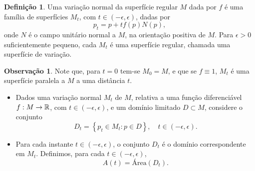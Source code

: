 \documentclass[10pt,a4paper]{beamer}
\theoremstyle{definition}
\newtheorem{definicao}{Definição}
\newtheorem{observacao}{Observação}
\begin{document}
\begin{frame}
	
	\begin{definicao}
		Uma \alert{variação normal} da superfície regular $M$ dada por $f$ é uma família de superfícies $M_t$, com $t \in (-\epsilon,\epsilon)$, dadas por
		\begin{equation*}
		p_t = p + t f(p) N(p),
		\end{equation*}
		onde $N$ é o campo unitário normal a $M$, na orientação positiva de $M$. Para $\epsilon > 0$ suficientemente pequeno, cada $M_t$ é uma superfície regular, chamada uma \alert{superfície de variação}.
	\end{definicao}

	\pause

	\begin{observacao}
		Note que, para $t=0$ tem-se $M_0 = M$, e que se $f \equiv 1$, $M_t$ é uma \alert{superfície paralela} a $M$ a uma distância $t$.
	\end{observacao}

\end{frame}

\begin{frame}
		
	\begin{itemize}
		\item Dados uma variação normal $M_t$ de $M$, relativa a uma função diferenciável $f: M \rightarrow \mathbb R$, com $t \in (-\epsilon,\epsilon)$, e um domínio limitado $D \subset M$, considere o conjunto
		\begin{equation*}
		D_t = \left\{ p_t \in M_t: p \in D \right\}, \quad t \in (-\epsilon,\epsilon).
		\end{equation*}
		
		\pause
		
		\item Para cada instante $t \in (-\epsilon,\epsilon)$, o conjunto $D_t$ é o domínio correspondente em $M_t$. Definimos, para cada $t \in (-\epsilon,\epsilon)$,
		\begin{equation*}
		A(t) = \text{Área} (D_t).
		\end{equation*}
	\end{itemize}

	 
	
	
	
	
\end{frame}
\end{document}
